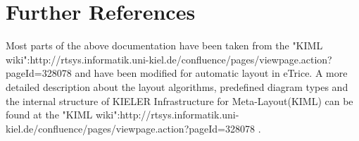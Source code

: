\section{Further References}

Most parts of the above documentation have been taken from the "KIML wiki":http://rtsys.informatik.uni-kiel.de/confluence/pages/viewpage.action?pageId=328078 and have been modified for automatic layout in eTrice. A more detailed description about the layout algorithms, predefined diagram types and the internal structure of KIELER Infrastructure for Meta-Layout(KIML) can be found at the "KIML wiki":http://rtsys.informatik.uni-kiel.de/confluence/pages/viewpage.action?pageId=328078 .